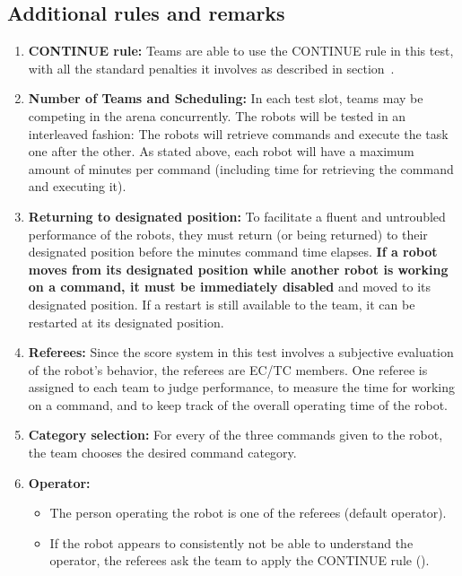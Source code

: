 \subsection{Additional rules and remarks}
\label{sec:eegpsr-remarks}
\begin{enumerate}
	\item \textbf{CONTINUE rule:} Teams are able to use the CONTINUE rule in this test, with all the standard penalties it involves as described in section~.

	\item \textbf{Number of Teams and Scheduling:} In each test slot, \eegpsrTeams teams may be competing in the arena concurrently. The robots will be tested in an interleaved fashion: The robots will retrieve commands and execute the task one after the other. As stated above, each robot will have a maximum amount of \eegpsrMaxCmdTime minutes per command (including time for retrieving the command and executing it).

	\item \textbf{Returning to designated position:} To facilitate a fluent and untroubled performance of the robots, they must return (or being returned) to their designated position before the \eegpsrMaxCmdTime minutes command time elapses. \textbf{If a robot moves from its designated position while another robot is working on a command, it must be immediately disabled} and moved to its designated position. If a restart is still available to the team, it can be restarted at its designated position.

	\item \textbf{Referees:} Since the score system in this test involves a subjective evaluation of the robot's behavior, the referees are EC/TC members. One referee is assigned to each team to judge performance, to measure the time for working on a command, and to keep track of the overall operating time of the robot.

	\item \textbf{Category selection:} For every of the three commands given to the robot, the team chooses the desired command category.

	\item \textbf{Operator:}
	\begin{itemize}
		\item The person operating the robot is one of the referees (default operator).
		\item If the robot appears to consistently not be able to understand the operator, the referees ask the team to apply the CONTINUE rule ().
	\end{itemize}


\end{enumerate}

